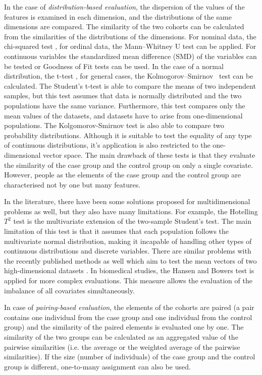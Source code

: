 In the case of \textit{distribution-based evaluation}, the dispersion of the values of the features is examined in each dimension, and the distributions of the same dimensions are compared. The similarity of the two cohorts can be calculated from the similarities of the distributions of the dimensions. For nominal data, the chi-squared test \cite{pearson1900x}, for ordinal data, the Mann--Whitney U test \cite{macfarland2016mann, mcknight2010mann} can be applied. For continuous variables the standardized mean difference (SMD) \cite{austin2009balance} of the variables can be tested or Goodness of Fit tests can be used. In the case of a normal distribution, the t-test \cite{student1908probable}, for general cases, the Kolmogorov--Smirnov~\cite{kolmogorov1933sulla, smirnov1948table} test can be calculated. The Student's t-test is able to compare the means of two independent samples, but this test assumes that data is normally distributed and the two populations have the same variance. Furthermore, this test compares only the mean values of the datasets, and datasets have to arise from one-dimensional populations. The Kolgomorov-Smirnov test is also able to compare two probability distributions. Although it is suitable to test the equality of any type of continuous distributions, it's application is also restricted to the one-dimensional vector space. The main drawback of these tests is that they evaluate the similarity of the case group and the control group on only a single covariate. However, people as the elements of the case group and the control group are characterised not by one but many features.

In the literature, there have been some solutions proposed for multidimensional problems as well, but they also have many limitations. For example, the Hotelling $T^2$ test \cite{hotelling1931generalization} is the multivariate extension of the two-sample Student's test. The main limitation of this test is that it assumes that each population follows the multivariate normal distribution, making it incapable of handling other types of continuous distributions and discrete variables. There are similar problems with the recently published methods as well which aim to test the mean vectors of two high-dimensional datasets \cite{park2013test, srivastava2013two, wang2015high}. In biomedical studies, the Hansen and Bowers test \cite{bowers2010ritools} is applied for more complex evaluations. This measure allows the evaluation of the imbalance of all covariates simultaneously.

In case of \textit{pairing-based evaluation}, the elements of the cohorts are paired (a pair contains one individual from the case group and one individual from the control group) and the similarity of the paired elements is evaluated one by one. The similarity of the two groups can be calculated as an aggregated value of the pairwise similarities (i.e. the average or the weighted average of the pairwise similarities). If the size (number of individuals) of the case group and the control group is different, one-to-many assignment can also be used.

